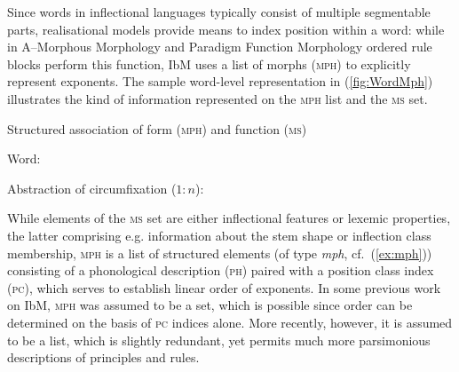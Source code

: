 \documentclass[output=paper
	        ,collection
	        ,collectionchapter
 	        ,biblatex
                ,babelshorthands
                ,newtxmath
                ,draftmode
                ,colorlinks, citecolor=brown
]{langscibook}
\begin{document}
\begin{exe}
\begin{xlist}
\begin{exe}
  \ex
  
  \label{fig:Word}
\end{exe}

Since words in inflectional languages typically consist of multiple
segment\-able parts, realisational models provide means to index
position within a word: while in A--Morphous Morphology
\citep[=AM;][]{Anderson92} and Paradigm Function Morphology
\citep[=PFM;][]{Stump01} ordered rule blocks perform this function, IbM
uses a list of morphs (\textsc{mph}) to explicitly represent
exponents.
The sample word-level representation in (\ref{fig:WordMph})
illustrates the kind of information represented on the \textsc{mph}
list and the \textsc{ms} set. 
\begin{exe}
  \ex Structured association of form (\textsc{mph}) and function (\textsc{ms})   \label{fig:WordMph}

  \begin{xlist}
    \ex Word:

    \ex Abstraction of circumfixation ($1:n$):

  \end{xlist}
\end{exe}
While elements of the \textsc{ms} set
are either inflectional features or lexemic properties, the latter
comprising e.g. information about the stem shape or inflection class
membership, \textsc{mph} is a list of structured elements (of type
\textit{mph}, cf.~(\ref{ex:mph})) consisting
of a phonological description (\textsc{ph}) paired with a position
class index (\textsc{pc}), which serves to establish linear order of
exponents. In some previous work on IbM, \textsc{mph} was assumed to
be a set, which is possible since order can be determined on the basis
of \textsc{pc} indices alone. More recently, however, it is assumed to
be a list, which is slightly redundant, yet permits much more
parsimonious descriptions of principles and rules.


\end{xlist}
\end{exe}
\end{document}
